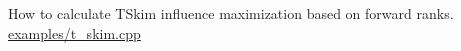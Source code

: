 How to calculate T\+Skim influence maximization based on forward ranks. \hyperlink{examples_2t_skim_8cpp-example}{examples/t\+\_\+skim.\+cpp} 